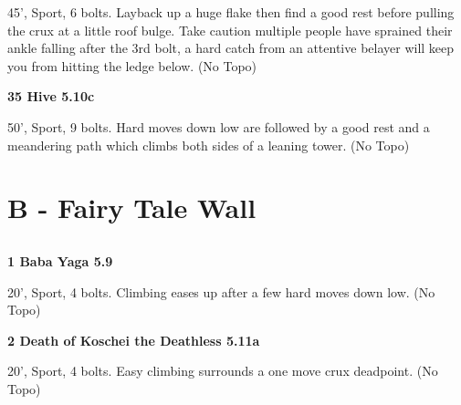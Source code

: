\begin{multicols}{2}
\begin{adjustwidth}{0.5cm}{}			
45', Sport, 6 bolts. Layback up a huge flake then find a good rest before pulling the crux at a little roof bulge. Take caution multiple people have sprained their ankle falling after the 3rd bolt, a hard catch from an attentive belayer will keep you from hitting the ledge below. (No Topo)
\end{adjustwidth}



\needspace{1.5cm}
\label{rt:Hive}
\colorbox{RoyalBlue!20}{
\parbox{0.95\linewidth}{
\textbf{
35 Hive 5.10c  
}}}

\begin{adjustwidth}{0.5cm}{}			
50', Sport, 9 bolts. Hard moves down low are followed by a good rest and a meandering path which climbs both sides of a leaning tower. (No Topo)
\end{adjustwidth}




\newpage

\section{B - Fairy Tale Wall}\label{sa:Fairy Tale Wall}




\needspace{1.5cm}
\subsection*{}\label{bf:}
	


\needspace{1.5cm}
\label{rt:Baba Yaga}
\colorbox{green!20}{
\parbox{0.95\linewidth}{
\textbf{
1 Baba Yaga 5.9  
}}}

\begin{adjustwidth}{0.5cm}{}			
20', Sport, 4 bolts. Climbing eases up after a few hard moves down low. (No Topo)
\end{adjustwidth}



\needspace{1.5cm}
\label{rt:Death of Koschei the Deathless}
\colorbox{RoyalBlue!20}{
\parbox{0.95\linewidth}{
\textbf{
2 Death of Koschei the Deathless 5.11a  
}}}

\begin{adjustwidth}{0.5cm}{}			
20', Sport, 4 bolts. Easy climbing surrounds a one move crux deadpoint. (No Topo)
\end{adjustwidth}




\end{multicols}
